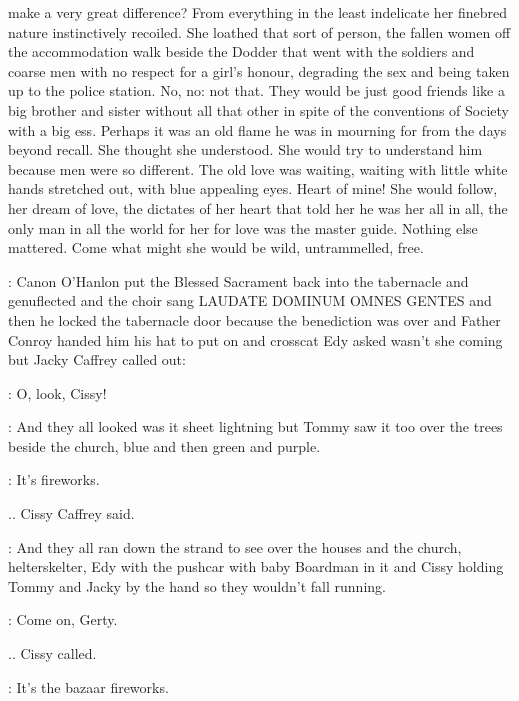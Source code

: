 make a very great difference? From everything in the least indelicate her
finebred nature instinctively recoiled. She loathed that sort of person,
the fallen women off the accommodation walk beside the Dodder that went
with the soldiers and coarse men with no respect for a girl's honour,
degrading the sex and being taken up to the police station. No, no: not
that. They would be just good friends like a big brother and sister
without all that other in spite of the conventions of Society with a big
ess. Perhaps it was an old flame he was in mourning for from the days
beyond recall. She thought she understood. She would try to understand
him because men were so different. The old love was waiting, waiting
with little white hands stretched out, with blue appealing eyes. Heart
of mine! She would follow, her dream of love, the dictates of her heart
that told her he was her all in all, the only man in all the world
for her for love was the master guide. Nothing else mattered. Come what
might she would be wild, untrammelled, free.

:
Canon O'Hanlon put the Blessed Sacrament back into the tabernacle
and genuflected and the choir sang LAUDATE DOMINUM OMNES GENTES and
then he locked the tabernacle door because the benediction was over and
Father Conroy handed him his hat to put on and crosscat Edy asked wasn't
she coming but Jacky Caffrey called out:

\jacky:
O, look, Cissy!

:
And they all looked was it sheet lightning but Tommy saw it too over
the trees beside the church, blue and then green and purple.

\cissy:
It's fireworks.

.. Cissy Caffrey said.

:
And they all ran down the strand to see over the houses and the
church, helterskelter, Edy with the pushcar with baby Boardman in it and
Cissy holding Tommy and Jacky by the hand so they wouldn't fall running.

\cissy:
Come on, Gerty.

.. Cissy called.

\cissy:
It's the bazaar fireworks.

